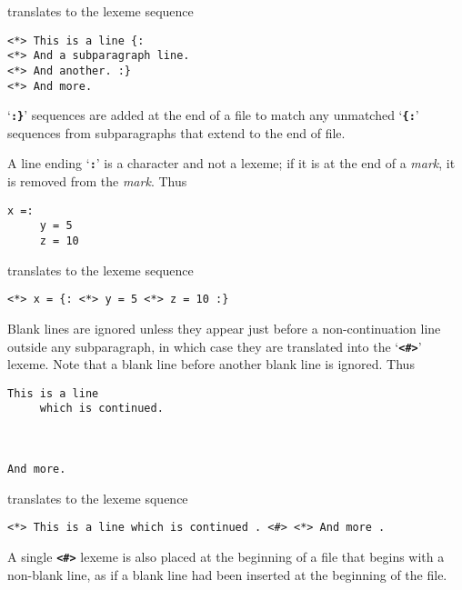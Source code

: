 \documentclass[12pt]{article}
\makeatletter
\newcommand{\TT}[1]{{\tt \bfseries #1}}
\newcommand{\ttkey}[1]{\TT{#1}\index{#1@{\tt #1}}}
\newenvironment{indpar}[1][0.3in]%
	{\begin{list}{}%
		     {\setlength{\itemsep}{0in}%
		      \setlength{\topsep}{0in}%
		      \setlength{\parsep}{1ex}%
		      \setlength{\labelwidth}{#1}%
		      \setlength{\leftmargin}{#1}%
		      \addtolength{\leftmargin}{\labelsep}}%
	 \item}%
	{\end{list}}
\makeatother
\begin{document}
translates to the lexeme sequence

\begin{indpar}\begin{verbatim}
<*> This is a line {:
<*> And a subparagraph line.
<*> And another. :}
<*> And more.
\end{verbatim}\end{indpar}

`\TT{:\}}' sequences are added at the end of a file to
match any unmatched `\TT{\{:}' sequences from subparagraphs
that extend to the end of file.

A line ending `\TT{:}' is a character and not a lexeme; if it
is at the end of a {\em mark}, it is removed from the {\em mark}.
Thus

\begin{indpar}\begin{verbatim}
x =:
     y = 5
     z = 10
\end{verbatim}\end{indpar}

translates to the lexeme sequence

\begin{indpar}\begin{verbatim}
<*> x = {: <*> y = 5 <*> z = 10 :}
\end{verbatim}\end{indpar}

Blank lines are ignored unless they appear just before a non-continuation
line outside any subparagraph,
in which case they are translated into the `\ttkey{<\#>}' lexeme.
Note that a blank line before another blank line is ignored.  Thus

\begin{indpar}\begin{verbatim}
This is a line
     which is continued.



And more.
\end{verbatim}\end{indpar}

translates to the lexeme squence

\begin{indpar}\begin{verbatim}
<*> This is a line which is continued . <#> <*> And more .
\end{verbatim}\end{indpar}


A single \TT{<\#>} lexeme is also placed at the beginning of
a file that begins with a non-blank line, as if a blank line 
had been inserted at the beginning of the file.
\end{document}
